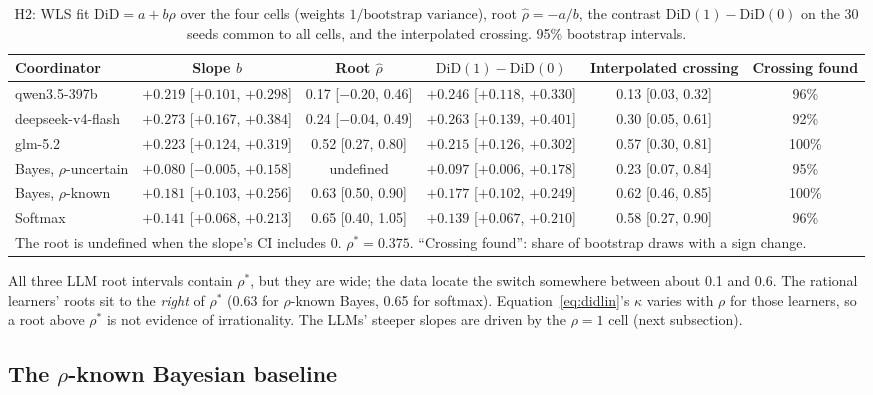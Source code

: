 \documentclass[11pt,letterpaper]{article}
\newcommand{\rhostar}{\rho^{*}}
\newcommand{\did}{\mathrm{DiD}}
\numberwithin{equation}{section}
\numberwithin{table}{section}
\numberwithin{figure}{section}
\numberwithin{algorithm}{section}
\begin{document}
\begin{table}[h]
\centering\small
\caption{H2: WLS fit $\did=a+b\rho$ over the four cells (weights $1/\text{bootstrap variance}$), root $\hat\rho=-a/b$, the contrast $\did(1)-\did(0)$ on the 30 seeds common to all cells, and the interpolated crossing. 95\% bootstrap intervals.}
\label{tab:h2}
\begin{adjustbox}{max width=\linewidth}
\begin{tabular}{lccccc}
\toprule
Coordinator & Slope $b$ & Root $\hat\rho$ & $\did(1)-\did(0)$ & Interpolated crossing & Crossing found \\
\midrule
qwen3.5-397b & $+0.219$ [$+0.101$, $+0.298$] & 0.17 [$-0.20$, 0.46] & $+0.246$ [$+0.118$, $+0.330$] & 0.13 [0.03, 0.32] & 96\% \\
deepseek-v4-flash & $+0.273$ [$+0.167$, $+0.384$] & 0.24 [$-0.04$, 0.49] & $+0.263$ [$+0.139$, $+0.401$] & 0.30 [0.05, 0.61] & 92\% \\
glm-5.2 & $+0.223$ [$+0.124$, $+0.319$] & 0.52 [0.27, 0.80] & $+0.215$ [$+0.126$, $+0.302$] & 0.57 [0.30, 0.81] & 100\% \\
\addlinespace
Bayes, $\rho$-uncertain & $+0.080$ [$-0.005$, $+0.158$] & undefined & $+0.097$ [$+0.006$, $+0.178$] & 0.23 [0.07, 0.84] & 95\% \\
Bayes, $\rho$-known & $+0.181$ [$+0.103$, $+0.256$] & 0.63 [0.50, 0.90] & $+0.177$ [$+0.102$, $+0.249$] & 0.62 [0.46, 0.85] & 100\% \\
Softmax & $+0.141$ [$+0.068$, $+0.213$] & 0.65 [0.40, 1.05] & $+0.139$ [$+0.067$, $+0.210$] & 0.58 [0.27, 0.90] & 96\% \\
\bottomrule
\multicolumn{6}{l}{\scriptsize The root is undefined when the slope's CI includes 0. $\rhostar=0.375$. ``Crossing found'': share of bootstrap draws with a sign change.}
\end{tabular}
\end{adjustbox}
\end{table}

\noindent All three LLM root intervals contain $\rhostar$, but they are wide; the data locate the switch somewhere between about 0.1 and 0.6. The rational learners' roots sit to the \emph{right} of $\rhostar$ (0.63 for $\rho$-known Bayes, 0.65 for softmax). Equation~\eqref{eq:didlin}'s $\kappa$ varies with $\rho$ for those learners, so a root above $\rhostar$ is not evidence of irrationality. The LLMs' steeper slopes are driven by the $\rho=1$ cell (next subsection).

\subsection{The $\rho$-known Bayesian baseline}
\end{document}
